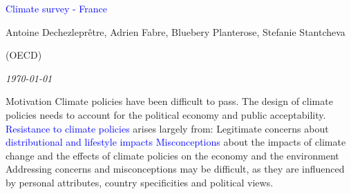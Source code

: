 



%
              





\begin{frame}
\thispagestyle{empty}
\begin{center}
\begin{LARGE}
\textcolor{blue}{Climate survey - France}
\end{LARGE}

\vspace{1cm}


Antoine Dechezleprêtre, Adrien Fabre, Bluebery Planterose, Stefanie Stantcheva 

\vspace{-0.3cm}
(OECD)

\textit{\today} 

\end{center}

\bigskip


\end{frame}

\begin{frame}{Motivation}
\bbs
\ip Climate policies have been difficult to pass.
\ip The design of climate policies needs to account for the political economy and public acceptability.
\ip \textcolor{blue}{Resistance to climate policies} arises largely from:
\bbs
\ip Legitimate concerns about \textcolor{blue}{distributional and lifestyle impacts}
\ip \textcolor{blue}{Misconceptions} about the impacts of climate change and the effects of climate policies on the economy and the environment
\ee 
\ip Addressing concerns and misconceptions may be difficult, as they are influenced by personal attributes, country specificities and political views.
\ee
\end{frame}

